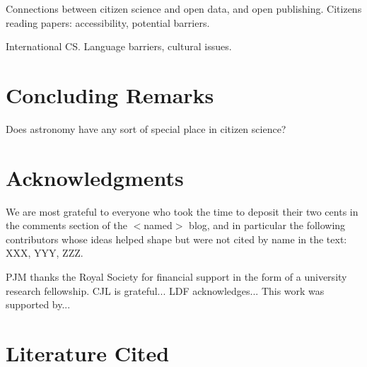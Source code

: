 \documentclass{ar2e}
\begin{document}
Connections between citizen science and open data, and open publishing. 
Citizens reading papers: accessibility, potential barriers. 

International CS. Language barriers, cultural issues. 



\section{Concluding Remarks}
\label{sec:conclusions}

Does astronomy have any sort of special place in citizen science?



\section*{Acknowledgments}

We are most grateful to everyone who took the time to deposit their two cents in
the comments section of the $<$named$>$ blog, and in particular the following
contributors whose ideas helped shape  but were not cited by
name in the text: XXX, YYY, ZZZ. 

PJM thanks the Royal Society for financial support in the form of a university
research fellowship.
%
CJL is grateful...
%
LDF acknowledges...
% 
This work was supported by...


\section{Literature Cited}





\end{document}
